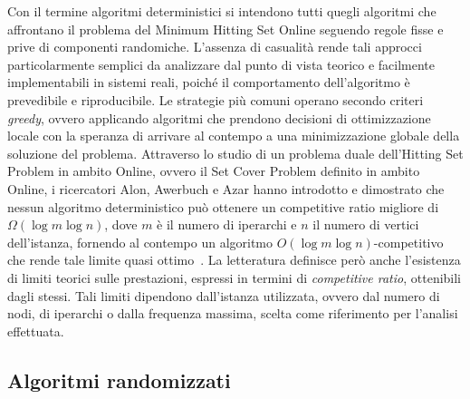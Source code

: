 Con il termine algoritmi deterministici si intendono tutti quegli algoritmi che affrontano il problema del Minimum Hitting Set Online seguendo regole fisse e prive di componenti randomiche.
L'assenza di casualità rende tali approcci particolarmente semplici da analizzare dal punto di vista teorico e facilmente implementabili in sistemi reali, poiché il comportamento dell'algoritmo è prevedibile e riproducibile.
Le strategie più comuni operano secondo criteri \emph{greedy}, ovvero applicando algoritmi che prendono decisioni di ottimizzazione locale con la speranza di arrivare al contempo a una minimizzazione globale della soluzione del problema.
Attraverso lo studio di un problema duale dell'Hitting Set Problem in ambito Online, ovvero il Set Cover Problem definito in ambito Online, i ricercatori Alon, Awerbuch e Azar hanno introdotto e dimostrato che nessun algoritmo deterministico può ottenere un competitive ratio migliore di $\Omega(\log m \log n)$, dove $m$ è il numero di iperarchi e $n$ il numero di vertici dell'istanza, fornendo al contempo un algoritmo $O(\log m \log n)$-competitivo che rende tale limite quasi ottimo~\cite{alon2003}.
La letteratura definisce però anche l'esistenza di limiti teorici sulle prestazioni, espressi in termini di \emph{competitive ratio}, ottenibili dagli stessi.
Tali limiti dipendono dall'istanza utilizzata, ovvero dal numero di nodi, di iperarchi o dalla frequenza massima, scelta come riferimento per l'analisi effettuata.

\subsection*{Algoritmi randomizzati}

